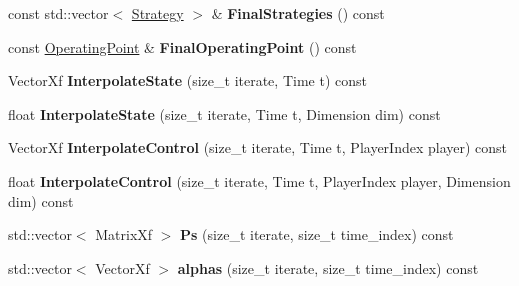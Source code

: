 \begin{DoxyCompactItemize}
\item 
const std\+::vector$<$ \hyperlink{structilqgames_1_1_strategy}{Strategy} $>$ \& {\bfseries Final\+Strategies} () const \hypertarget{classilqgames_1_1_solver_log_a3e998ebe01b5437dbea33c1e32739cbe}{}\label{classilqgames_1_1_solver_log_a3e998ebe01b5437dbea33c1e32739cbe}

\item 
const \hyperlink{structilqgames_1_1_operating_point}{Operating\+Point} \& {\bfseries Final\+Operating\+Point} () const \hypertarget{classilqgames_1_1_solver_log_ac02232ae7fa57715bc0b1795f4dd059f}{}\label{classilqgames_1_1_solver_log_ac02232ae7fa57715bc0b1795f4dd059f}

\item 
Vector\+Xf {\bfseries Interpolate\+State} (size\+\_\+t iterate, Time t) const \hypertarget{classilqgames_1_1_solver_log_a86b8dd605c03955a6fbafa2dc0b2a341}{}\label{classilqgames_1_1_solver_log_a86b8dd605c03955a6fbafa2dc0b2a341}

\item 
float {\bfseries Interpolate\+State} (size\+\_\+t iterate, Time t, Dimension dim) const \hypertarget{classilqgames_1_1_solver_log_ac81714a5caf9e2f497ed04b58e333757}{}\label{classilqgames_1_1_solver_log_ac81714a5caf9e2f497ed04b58e333757}

\item 
Vector\+Xf {\bfseries Interpolate\+Control} (size\+\_\+t iterate, Time t, Player\+Index player) const \hypertarget{classilqgames_1_1_solver_log_ac7d6053a5764889fca2ec5cf5a462988}{}\label{classilqgames_1_1_solver_log_ac7d6053a5764889fca2ec5cf5a462988}

\item 
float {\bfseries Interpolate\+Control} (size\+\_\+t iterate, Time t, Player\+Index player, Dimension dim) const \hypertarget{classilqgames_1_1_solver_log_af8fd1063450f96fa3e5029bc07b5b39b}{}\label{classilqgames_1_1_solver_log_af8fd1063450f96fa3e5029bc07b5b39b}

\item 
std\+::vector$<$ Matrix\+Xf $>$ {\bfseries Ps} (size\+\_\+t iterate, size\+\_\+t time\+\_\+index) const \hypertarget{classilqgames_1_1_solver_log_a5429c067fefb9d902be11cb881247a81}{}\label{classilqgames_1_1_solver_log_a5429c067fefb9d902be11cb881247a81}

\item 
std\+::vector$<$ Vector\+Xf $>$ {\bfseries alphas} (size\+\_\+t iterate, size\+\_\+t time\+\_\+index) const \hypertarget{classilqgames_1_1_solver_log_ae4725b1be8df5cb17312e8bb27bf1954}{}\label{classilqgames_1_1_solver_log_ae4725b1be8df5cb17312e8bb27bf1954}


\end{DoxyCompactItemize}
